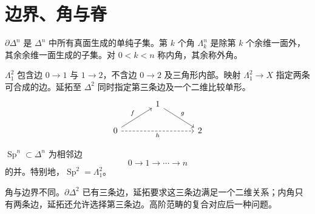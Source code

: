 \section{边界、角与脊}
\begin{definition}[边界与角]
$\partial\Delta^n$ 是 $\Delta^n$ 中所有真面生成的单纯子集。第 $k$ 个角 $\Lambda_k^n$ 是除第 $k$ 个余维一面外，其余余维一面生成的子集。对 $0<k<n$ 称内角，其余称外角。
\end{definition}
\begin{example}[二维内角]
$\Lambda_1^2$ 包含边 $0\to1$ 与 $1\to2$，不含边 $0\to2$ 及三角形内部。映射 $\Lambda_1^2\to X$ 指定两条可合成的边。延拓至 $\Delta^2$ 同时指定第三条边及一个二维比较单形。
\[
\begin{tikzcd}[column sep=large]
&1\ar[dr,"g"]&\\
0\ar[ur,"f"]\ar[rr,dashed,"h"']&&2
\end{tikzcd}
\]
\end{example}
\begin{definition}[脊]
$\operatorname{Sp}^n\subset\Delta^n$ 为相邻边
\[
0\longrightarrow1\longrightarrow\cdots\longrightarrow n
\]
的并。特别地，$\operatorname{Sp}^2=\Lambda_1^2$。
\end{definition}
\begin{remark}
角与边界不同。$\partial\Delta^2$ 已有三条边，延拓要求这三条边满足一个二维关系；内角只有两条边，延拓还允许选择第三条边。高阶范畴的复合对应后一种问题。
\end{remark}

